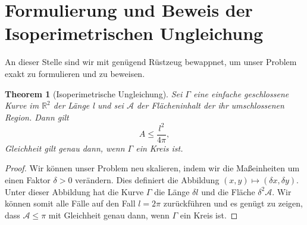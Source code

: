 \documentclass[12pt,a4paper]{article}
\theoremstyle{plain}
\newtheorem{Theorem}{Theorem}[section]
\newcommand{\R}{\mathbb{R}}
\numberwithin{equation}{section}
\begin{document}
\section{Formulierung und Beweis der Isoperimetrischen Ungleichung}
An dieser Stelle sind wir mit genügend Rüstzeug bewappnet, um unser Problem exakt zu formulieren und zu beweisen.
\begin{Theorem}[Isoperimetrische Ungleichung]
Sei $\Gamma$ eine einfache geschlossene Kurve im $\R^2$ der Länge l und sei $\mathcal{A}$ der Flächeninhalt der ihr umschlossenen Region. Dann gilt
\[ A\leq \frac{l^2}{4\pi}, \]
Gleichheit gilt genau dann, wenn $\Gamma$ ein Kreis ist.
\end{Theorem}
\begin{proof}
Wir können unser Problem neu skalieren, indem wir die Maßeinheiten um einen Faktor $\delta>0$ verändern. Dies definiert die Abbildung $(x,y) \mapsto (\delta x, \delta y)$. Unter dieser Abbildung hat die Kurve $\Gamma$ die Länge $\delta l$ und die Fläche $\delta^2 \mathcal{A}$. Wir können somit alle Fälle auf den Fall $l=2\pi$ zurückführen und es genügt zu zeigen, dass $\mathcal{A}\leq \pi$ mit Gleichheit genau dann, wenn $\Gamma$ ein Kreis ist.


\end{proof}
\end{document}
